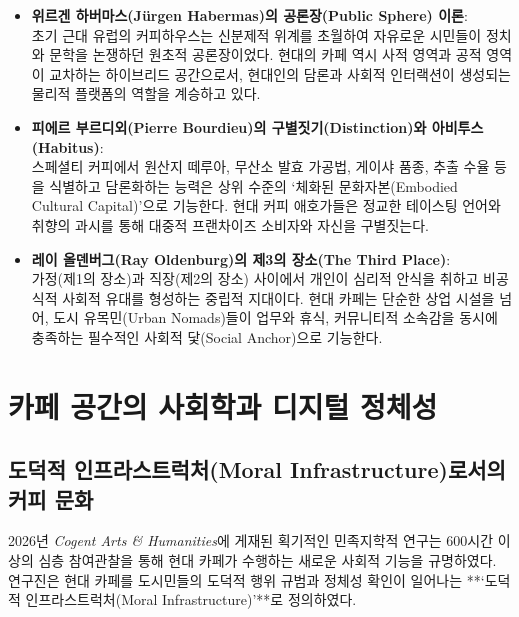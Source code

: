 \documentclass[10pt,a4paper]{article}
\begin{document}
\begin{itemize}[itemsep=4pt,leftmargin=1.8em]
    \item \textbf{위르겐 하버마스(Jürgen Habermas)의 공론장(Public Sphere) 이론}:\\
    초기 근대 유럽의 커피하우스는 신분제적 위계를 초월하여 자유로운 시민들이 정치와 문학을 논쟁하던 원초적 공론장이었다. 현대의 카페 역시 사적 영역과 공적 영역이 교차하는 하이브리드 공간으로서, 현대인의 담론과 사회적 인터랙션이 생성되는 물리적 플랫폼의 역할을 계승하고 있다.
    
    \item \textbf{피에르 부르디외(Pierre Bourdieu)의 구별짓기(Distinction)와 아비투스(Habitus)}:\\
    스페셜티 커피에서 원산지 떼루아, 무산소 발효 가공법, 게이샤 품종, 추출 수율 등을 식별하고 담론화하는 능력은 상위 수준의 ‘체화된 문화자본(Embodied Cultural Capital)’으로 기능한다. 현대 커피 애호가들은 정교한 테이스팅 언어와 취향의 과시를 통해 대중적 프랜차이즈 소비자와 자신을 구별짓는다.
    
    \item \textbf{레이 올덴버그(Ray Oldenburg)의 제3의 장소(The Third Place)}:\\
    가정(제1의 장소)과 직장(제2의 장소) 사이에서 개인이 심리적 안식을 취하고 비공식적 사회적 유대를 형성하는 중립적 지대이다. 현대 카페는 단순한 상업 시설을 넘어, 도시 유목민(Urban Nomads)들이 업무와 휴식, 커뮤니티적 소속감을 동시에 충족하는 필수적인 사회적 닻(Social Anchor)으로 기능한다.
\end{itemize}

\section{카페 공간의 사회학과 디지털 정체성}

\subsection{도덕적 인프라스트럭처(Moral Infrastructure)로서의 커피 문화}
2026년 \textit{Cogent Arts \& Humanities}에 게재된 획기적인 민족지학적 연구는 600시간 이상의 심층 참여관찰을 통해 현대 카페가 수행하는 새로운 사회적 기능을 규명하였다. 연구진은 현대 카페를 도시민들의 도덕적 행위 규범과 정체성 확인이 일어나는 **‘도덕적 인프라스트럭처(Moral Infrastructure)’**로 정의하였다.
\end{document}
